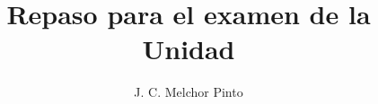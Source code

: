 \documentclass[12pt,addpoints,answers]{repaso}
\title{Repaso para el examen de la Unidad}
\author{J. C. Melchor Pinto}
\begin{document}
\INFO
\begin{multicols}{2}
     
     
     
     
\end{multicols}
\newpage

\begin{questions}
      \question[6]
     
     \question[6]
     
     
     \newpage
     
     
     \begin{multicols}{2}
          
     \end{multicols}
     \newpage
     
     \newpage
     
     \newpage
     
\end{questions}
\end{document}

